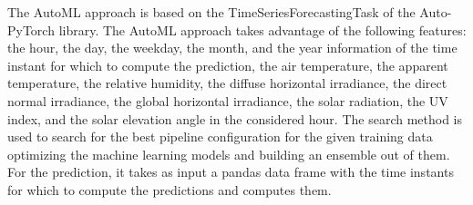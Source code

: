 The AutoML approach is based on the TimeSeriesForecastingTask of the Auto-PyTorch library.
The AutoML approach takes advantage of the following features: the hour, the day, the weekday, the month, and the year information of the time instant for which to compute the prediction, the air temperature, the apparent temperature, the relative humidity, the diffuse horizontal irradiance, the direct normal irradiance, the global horizontal irradiance, the solar radiation, the UV index, and the solar elevation angle in the considered hour.
The search method is used to search for the best pipeline configuration for the given training data optimizing the machine learning models and building an ensemble out of them.
For the prediction, it takes as input a pandas data frame with the time instants for which to compute the predictions and computes them.
